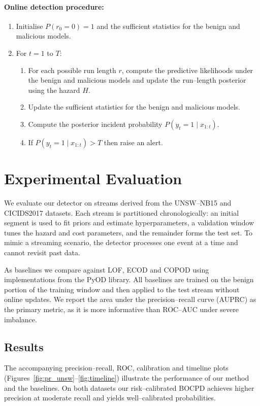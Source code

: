 \documentclass{article}
\begin{document}
\paragraph{Online detection procedure:}
\begin{enumerate}
  \item Initialise $P(r_0=0)=1$ and the sufficient statistics for the benign and malicious models.
  \item For $t = 1$ to $T$:
    \begin{enumerate}
      \item For each possible run length $r$, compute the predictive likelihoods under the benign and malicious models and update the run--length posterior using the hazard $H$.
      \item Update the sufficient statistics for the benign and malicious models.
      \item Compute the posterior incident probability $P(y_t=1\mid x_{1:t})$.
      \item If $P(y_t=1\mid x_{1:t}) > T$ then raise an alert.
    \end{enumerate}
\end{enumerate}

\section{Experimental Evaluation}
We evaluate our detector on streams derived from the UNSW--NB15 and CICIDS2017 datasets.  Each stream is partitioned chronologically: an initial segment is used to fit priors and estimate hyperparameters, a validation window tunes the hazard and cost parameters, and the remainder forms the test set.  To mimic a streaming scenario, the detector processes one event at a time and cannot revisit past data.

As baselines we compare against LOF, ECOD and COPOD using implementations from the PyOD library.  All baselines are trained on the benign portion of the training window and then applied to the test stream without online updates.  We report the area under the precision--recall curve (AUPRC) as the primary metric, as it is more informative than ROC--AUC under severe imbalance.

\subsection{Results}
The accompanying precision--recall, ROC, calibration and timeline plots (Figures~\ref{fig:pr_unsw}--\ref{fig:timeline}) illustrate the performance of our method and the baselines.  On both datasets our risk--calibrated BOCPD achieves higher precision at moderate recall and yields well--calibrated probabilities.
\end{document}
